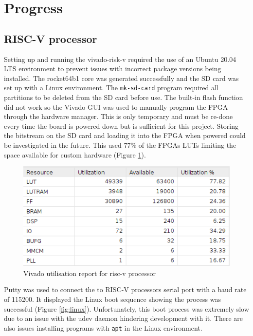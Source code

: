 \section{Progress}
\label{sec:progress}

\subsection{RISC-V processor}
Setting up and running the vivado-risk-v \cite{vivado-risk-v} required the use of an Ubuntu 20.04 LTS environment to prevent issues with incorrect package versions being installed. The rocket64b1 core was generated successfully and the SD card was set up with a Linux environment. The \texttt{mk-sd-card} program required all partitions to be deleted from the SD card before use. The built-in flash function did not work so the Vivado GUI was used to manually program the FPGA through the hardware manager. This is only temporary and must be re-done every time the board is powered down but is sufficient for this project. Storing the bitstream on the SD card and loading it into the FPGA when powered could be investigated in the future. This used 77\% of the FPGAs LUTs limiting the space available for custom hardware (Figure \ref{fig:LUT_usage}).

\begin{figure}[H]
	\centering
	\includegraphics[scale=0.6]{../common/vivado-risk-v Uilization.png}
	\caption{Vivado utilisation report for risc-v processor}
	\label{fig:LUT_usage}
\end{figure}

Putty was used to connect the to RISC-V processors serial port with a baud rate of 115200. It displayed the Linux boot sequence showing the process was successful (Figure \ref{fig:linux}). Unfortunately, this boot process was extremely slow due to an issue with the udev daemon hindering development with it. There are also issues installing programs with \texttt{apt} in the Linux environment.

